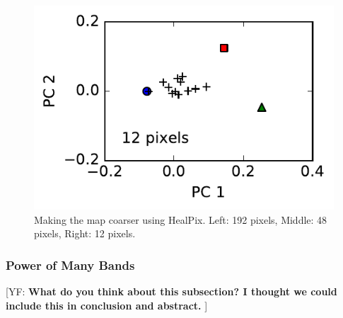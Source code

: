 \documentclass[iop,numberedappendix,apj]{emulateapj}
\def\memoYF#1{\color{red}[YF: {\bf #1}]\color{black}}
\begin{document}
\begin{figure}[tbh!]
\begin{minipage}{0.33\hsize}
\begin{center}
\includegraphics[width=\hsize]{IGBP_PCplane_Nside0.pdf}
    \end{center}
     \end{minipage}
    \caption{Making the map coarser using HealPix. Left: 192 pixels, Middle: 48 pixels, Right: 12 pixels. }
\label{fig:lowresolution}
\end{figure}


\subsubsection{Power of Many Bands}

\memoYF{What do you think about this subsection? I thought we could include this in conclusion and abstract. }
\end{document}

